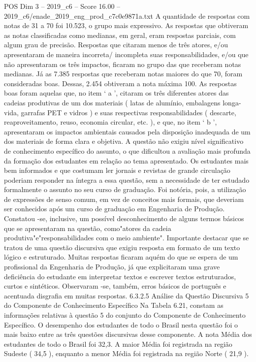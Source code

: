 \begin{textsample}{POS Dim 3 – 2019\_c6 – Score 16.00 – 2019\_c6/enade\_2019\_eng\_prod\_c7c0e9871a.txt}
A quantidade de respostas com notas de 31 a 70 foi 10.523, o grupo mais expressivo.
As respostas que obtiveram as notas classificadas como medianas, em geral, eram respostas parciais, com algum grau de precisão.
Respostas que citaram menos de três atores, e/ou apresentaram de maneira incorreta/ incompleta suas responsabilidades, e/ou que não apresentaram os três impactos, ficaram no grupo das que receberam notas medianas.
Já as 7.385 respostas que receberam notas maiores do que 70, foram consideradas boas.
Dessas, 2.454 obtiveram a nota máxima 100.
As respostas boas foram aquelas que, no item ‘ a ’, citaram os três diferentes atores das cadeias produtivas de um dos materiais ( latas de alumínio, embalagens longa-vida, garrafas PET e vidros ) e suas respectivas responsabilidades ( descarte, reaproveitamento, reuso, economia circular, etc. ), e que, no item ‘ b ’, apresentaram os impactos ambientais causados pela disposição inadequada de um dos materiais de forma clara e objetiva.
A questão não exigiu nível significativo de conhecimento específico do assunto, o que dificultou a avaliação mais profunda da formação dos estudantes em relação ao tema apresentado.
Os estudantes mais bem informados e que costumam ler jornais e revistas de grande circulação poderiam responder na íntegra a essa questão, sem a necessidade de ter estudado formalmente o assunto no seu curso de graduação.
Foi notória, pois, a utilização de expressões de senso comum, em vez de conceitos mais formais, que deveriam ser conhecidos após um curso de graduação em Engenharia de Produção.
Constatou -se, inclusive, um possível desconhecimento de alguns termos básicos que se apresentaram na questão, como"atores da cadeia produtiva"e"responsabilidades com o meio ambiente".
Importante destacar que se tratou de uma questão discursiva que exigiu resposta em formato de um texto lógico e estruturado.
Muitas respostas ficaram aquém do que se espera de um profissional da Engenharia de Produção, já que explicitaram uma grave deficiência do estudante em interpretar textos e escrever textos estruturados, curtos e sintéticos.
Observaram -se, também, erros básicos de português e acentuada disgrafia em muitas respostas. 6.3.2.5 Análise da Questão Discursiva 5 do Componente de Conhecimento Específico Na Tabela 6.21, constam as informações relativas à questão 5 do conjunto do Componente de Conhecimento Específico.
O desempenho dos estudantes de todo o Brasil nesta questão foi o mais baixo entre as três questões discursivas desse componente.
A nota Média dos estudantes de todo o Brasil foi 32,3.
A maior Média foi registrada na região Sudeste ( 34,5 ), enquanto a menor Média foi registrada na região Norte ( 21,9 ).

\end{textsample}
